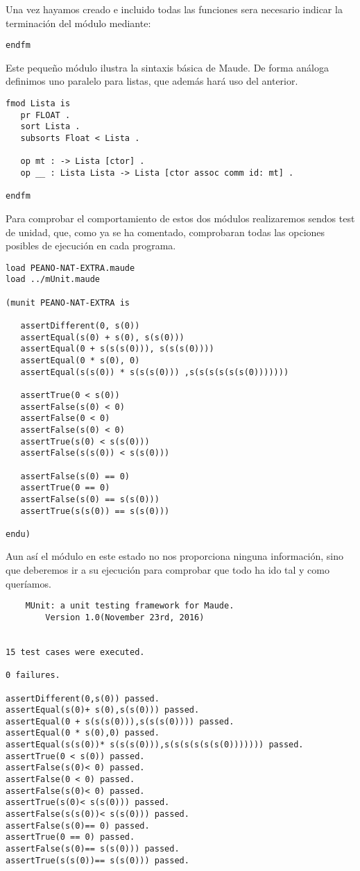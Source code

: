 Una vez hayamos creado e incluido todas las funciones sera necesario indicar la terminación del módulo mediante: \par

{\codesize
\begin{verbatim}
endfm
\end{verbatim}
}

Este pequeño m\'odulo ilustra la sintaxis b\'asica de Maude. De forma an\'aloga definimos uno paralelo para listas, que adem\'as har\'a uso del anterior. 

\begin{verbatim}
fmod Lista is
   pr FLOAT .
   sort Lista .
   subsorts Float < Lista .
	
   op mt : -> Lista [ctor] .
   op __ : Lista Lista -> Lista [ctor assoc comm id: mt] .

endfm
\end{verbatim}

Para comprobar el comportamiento de estos dos m\'odulos realizaremos sendos test de unidad, que, como ya se ha comentado, comprobaran todas las opciones posibles de ejecuci\'on en cada programa. \par

\begin{verbatim}
load PEANO-NAT-EXTRA.maude
load ../mUnit.maude

(munit PEANO-NAT-EXTRA is

   assertDifferent(0, s(0))
   assertEqual(s(0) + s(0), s(s(0)))
   assertEqual(0 + s(s(s(0))), s(s(s(0))))
   assertEqual(0 * s(0), 0)
   assertEqual(s(s(0)) * s(s(s(0))) ,s(s(s(s(s(s(0)))))))

   assertTrue(0 < s(0))
   assertFalse(s(0) < 0)
   assertFalse(0 < 0)
   assertFalse(s(0) < 0)
   assertTrue(s(0) < s(s(0)))
   assertFalse(s(s(0)) < s(s(0)))
   
   assertFalse(s(0) == 0)
   assertTrue(0 == 0)
   assertFalse(s(0) == s(s(0)))
   assertTrue(s(s(0)) == s(s(0)))
   
endu)
\end{verbatim}

Aun as\' i el m\'odulo en este estado no nos proporciona ninguna informaci\'on, sino que deberemos ir a su ejecuci\'on para comprobar que todo ha ido tal y como quer\'iamos. \par

\begin{verbatim}
	MUnit: a unit testing framework for Maude.
		Version 1.0(November 23rd, 2016)


15 test cases were executed.

0 failures.

assertDifferent(0,s(0)) passed.
assertEqual(s(0)+ s(0),s(s(0))) passed.
assertEqual(0 + s(s(s(0))),s(s(s(0)))) passed.
assertEqual(0 * s(0),0) passed.
assertEqual(s(s(0))* s(s(s(0))),s(s(s(s(s(s(0))))))) passed.
assertTrue(0 < s(0)) passed.
assertFalse(s(0)< 0) passed.
assertFalse(0 < 0) passed.
assertFalse(s(0)< 0) passed.
assertTrue(s(0)< s(s(0))) passed.
assertFalse(s(s(0))< s(s(0))) passed.
assertFalse(s(0)== 0) passed.
assertTrue(0 == 0) passed.
assertFalse(s(0)== s(s(0))) passed.
assertTrue(s(s(0))== s(s(0))) passed.
\end{verbatim}

